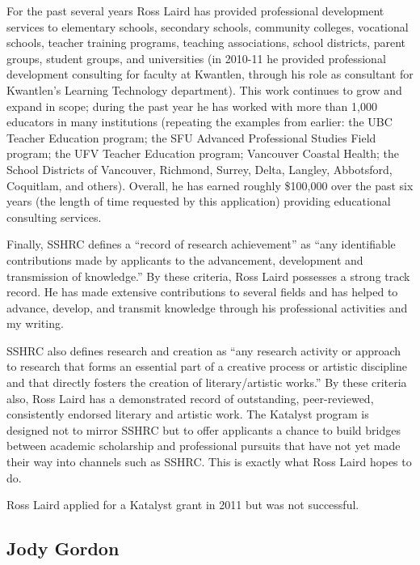 \documentclass[letterpaper,10pt,headsepline]{scrreprt}
\begin{document}
For the past several years Ross Laird has provided professional development
services to elementary schools, secondary schools, community colleges,
vocational schools, teacher training programs, teaching associations, school
districts, parent groups, student groups, and universities (in 2010-11 he
provided professional development consulting for faculty at Kwantlen, through
his role as consultant for Kwantlen's Learning Technology department). This
work continues to grow and expand in scope; during the past year he has worked
with more than 1,000 educators in many institutions (repeating the examples
from earlier: the UBC Teacher Education program; the SFU Advanced Professional
Studies Field program; the UFV Teacher Education program; Vancouver Coastal
Health; the School Districts of Vancouver, Richmond, Surrey, Delta, Langley,
Abbotsford, Coquitlam, and others). Overall, he has earned roughly \$100,000
over the past six years (the length of time requested by this application)
providing educational consulting services.

Finally, SSHRC defines a ``record of research achievement'' as ``any identifiable
contributions made by applicants to the advancement, development and
transmission of knowledge.'' By these criteria, Ross Laird possesses a strong
track record. He has made extensive contributions to several fields and has
helped to advance, develop, and transmit knowledge through his professional
activities and my writing.

SSHRC also defines research and creation as ``any research activity or approach
to research that forms an essential part of a creative process or artistic
discipline and that directly fosters the creation of literary/artistic works.''
By these criteria also, Ross Laird has a demonstrated record of outstanding,
peer-reviewed, consistently endorsed literary and artistic work. The Katalyst
program is designed not to mirror SSHRC but to offer applicants a chance to
build bridges between academic scholarship and professional pursuits that have
not yet made their way into channels such as SSHRC. This is exactly what Ross
Laird hopes to do.

Ross Laird applied for a Katalyst grant in 2011 but was not successful.

\subsection{Jody Gordon}
\end{document}
